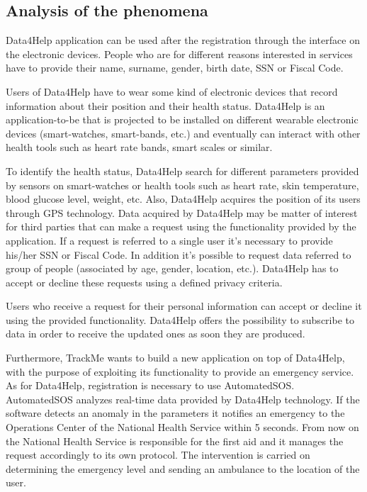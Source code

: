 \subsection{Analysis of the phenomena}
Data4Help application can be used after the registration through the interface on the electronic devices.
People who are for different reasons interested in services have to provide their name, surname, gender, birth date, SSN or Fiscal Code.
\par Users of Data4Help have to wear some kind of electronic devices that record information about their position and their health status.
Data4Help is an application-to-be that is projected to be installed on different wearable electronic devices (smart-watches, smart-bands, etc.) and eventually can interact with other health tools such as heart rate bands, smart scales or similar.
\par To identify the health status, Data4Help search for different parameters provided by sensors on smart-watches or health tools such as heart rate, skin temperature, blood glucose level, weight, etc.
Also, Data4Help acquires the position of its users through GPS technology.
\newline Data acquired by Data4Help may be matter of interest for third parties that can make a request using the functionality provided by the application. If a request is referred to a single user it's necessary to provide his/her SSN or Fiscal Code. In addition it's possible to request data referred to group of people (associated by age, gender, location, etc.). Data4Help has to accept or decline these requests using a defined privacy criteria.
\par Users who receive a request for their personal information can accept or decline it using the provided functionality.
\newline Data4Help offers the possibility to subscribe to data in order to receive the updated ones as soon they are produced.
\par Furthermore, TrackMe wants to build a new application on top of Data4Help, with the purpose of exploiting its functionality to provide an emergency service.
As for Data4Help, registration is necessary to use AutomatedSOS.
\newline AutomatedSOS analyzes real-time data provided by Data4Help technology.
If the software detects an anomaly in the parameters it notifies an emergency to the Operations Center of the National Health Service within 5 seconds. 
From now on the National Health Service is responsible for the first aid and it manages the request accordingly to its own protocol.
The intervention is carried on determining the emergency level and sending an ambulance to the location of the user.

